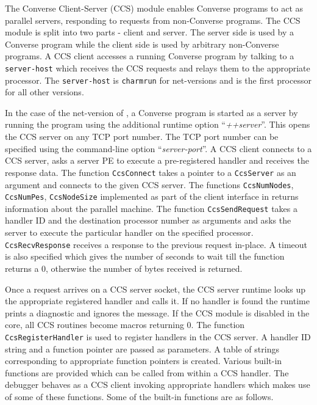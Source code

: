 \documentclass[10pt]{article}
\begin{document}
The Converse Client-Server (CCS) module enables Converse
\cite{InterOpIPPS96} programs to act as parallel servers,
responding to requests from non-Converse programs. The CCS module
is split into two parts - client and server. The server side is
used by a Converse program while the client side is used by
arbitrary non-Converse programs. A CCS client accesses a running
Converse program by talking to a \texttt{server-host} which
receives the CCS requests and relays them to the appropriate
processor. The \texttt{server-host} is \texttt{charmrun}
\cite{charmman} for net-versions and is the first processor for
all other versions.

In the case of the net-version of \charmpp{}, a Converse program
is started as a server by running the \charmpp{} program using the
additional runtime option ``\textit{++server}''. This opens the CCS
server on any TCP port number. The TCP port number can be
specified using the command-line option ``\textit{server-port}''. A
CCS client connects to a CCS server, asks a server PE to execute a
pre-registered handler and receives the response data. The
function \texttt{CcsConnect} takes a pointer to a
\texttt{CcsServer} as an argument and connects to the given CCS
server. The functions \texttt{CcsNumNodes}, \texttt{CcsNumPes},
\texttt{CcsNodeSize} implemented as part of the client interface
in \charmpp{} returns information about the parallel machine. The
function \texttt{CcsSendRequest} takes a handler ID and the
destination processor number as arguments and asks the server to
execute the particular handler on the specified processor.
\texttt{CcsRecvResponse} receives a response to the previous
request in-place. A timeout is also specified which gives the
number of seconds to wait till the function returns a 0, otherwise
the number of bytes received is returned.

Once a request arrives on a CCS server socket, the CCS server
runtime looks up the appropriate registered handler and calls it.
If no handler is found the runtime prints a diagnostic and ignores
the message. If the CCS module is disabled in the core, all CCS
routines become macros returning 0. The function
\texttt{CcsRegisterHandler} is used to register handlers in the
CCS server. A handler ID string and a function pointer are passed
as parameters. A table of strings corresponding to appropriate
function pointers is created. Various built-in functions are
provided which can be called from within a CCS handler. The
debugger behaves as a CCS client invoking appropriate handlers
which makes use of some of these functions. Some of the built-in
functions are as follows.
\end{document}
